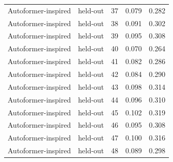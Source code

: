 \begin{tabular}{llrrr}
Autoformer-inspired & held-out & 37 & 0.079 & 0.282 \\
Autoformer-inspired & held-out & 38 & 0.091 & 0.302 \\
Autoformer-inspired & held-out & 39 & 0.095 & 0.308 \\
Autoformer-inspired & held-out & 40 & 0.070 & 0.264 \\
Autoformer-inspired & held-out & 41 & 0.082 & 0.286 \\
Autoformer-inspired & held-out & 42 & 0.084 & 0.290 \\
Autoformer-inspired & held-out & 43 & 0.098 & 0.314 \\
Autoformer-inspired & held-out & 44 & 0.096 & 0.310 \\
Autoformer-inspired & held-out & 45 & 0.102 & 0.319 \\
Autoformer-inspired & held-out & 46 & 0.095 & 0.308 \\
Autoformer-inspired & held-out & 47 & 0.100 & 0.316 \\
Autoformer-inspired & held-out & 48 & 0.089 & 0.298 \\
\bottomrule
\end{tabular}
